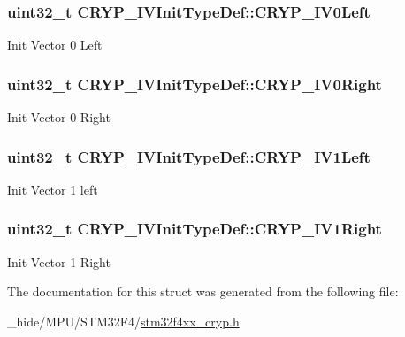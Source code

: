 \subsubsection[{C\+R\+Y\+P\+\_\+\+I\+V0\+Left}]{\setlength{\rightskip}{0pt plus 5cm}uint32\+\_\+t C\+R\+Y\+P\+\_\+\+I\+V\+Init\+Type\+Def\+::\+C\+R\+Y\+P\+\_\+\+I\+V0\+Left}\label{struct_c_r_y_p___i_v_init_type_def_a36a3734747b9c32e2cde67cb54be02f8}
Init Vector 0 Left \hypertarget{struct_c_r_y_p___i_v_init_type_def_ad7128fb8cf3843c2e0f89cf048cd28d5}{}
\subsubsection[{C\+R\+Y\+P\+\_\+\+I\+V0\+Right}]{\setlength{\rightskip}{0pt plus 5cm}uint32\+\_\+t C\+R\+Y\+P\+\_\+\+I\+V\+Init\+Type\+Def\+::\+C\+R\+Y\+P\+\_\+\+I\+V0\+Right}\label{struct_c_r_y_p___i_v_init_type_def_ad7128fb8cf3843c2e0f89cf048cd28d5}
Init Vector 0 Right \hypertarget{struct_c_r_y_p___i_v_init_type_def_a5edca0a5d021ee77fcfcdf9e29e27a53}{}
\subsubsection[{C\+R\+Y\+P\+\_\+\+I\+V1\+Left}]{\setlength{\rightskip}{0pt plus 5cm}uint32\+\_\+t C\+R\+Y\+P\+\_\+\+I\+V\+Init\+Type\+Def\+::\+C\+R\+Y\+P\+\_\+\+I\+V1\+Left}\label{struct_c_r_y_p___i_v_init_type_def_a5edca0a5d021ee77fcfcdf9e29e27a53}
Init Vector 1 left \hypertarget{struct_c_r_y_p___i_v_init_type_def_a936f532460c581298620960b511aa448}{}
\subsubsection[{C\+R\+Y\+P\+\_\+\+I\+V1\+Right}]{\setlength{\rightskip}{0pt plus 5cm}uint32\+\_\+t C\+R\+Y\+P\+\_\+\+I\+V\+Init\+Type\+Def\+::\+C\+R\+Y\+P\+\_\+\+I\+V1\+Right}\label{struct_c_r_y_p___i_v_init_type_def_a936f532460c581298620960b511aa448}
Init Vector 1 Right 

The documentation for this struct was generated from the following file\+:\begin{DoxyCompactItemize}
\item 
\+\_\+hide/\+M\+P\+U/\+S\+T\+M32\+F4/\hyperlink{stm32f4xx__cryp_8h}{stm32f4xx\+\_\+cryp.\+h}\end{DoxyCompactItemize}
